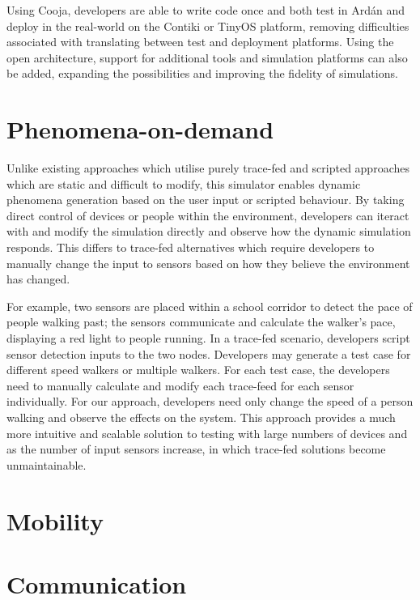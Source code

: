 Using Cooja, developers are able to write code once and both test in Ard\'{a}n and deploy in the real-world on the Contiki or TinyOS platform, removing difficulties associated with translating between test and deployment platforms. Using the open architecture, support for additional tools and simulation platforms can also be added, expanding the possibilities and improving the fidelity of simulations.

\section{Phenomena-on-demand} %
\label{sec:phenomena_on_demand}
Unlike existing approaches which utilise purely trace-fed and scripted approaches which are static and difficult to modify, this simulator enables dynamic phenomena generation based on the user input or scripted behaviour. 
By taking direct control of devices or people within the environment, developers can iteract with and modify the simulation directly and observe how the dynamic simulation responds. This differs to trace-fed alternatives which require developers to manually change the input to sensors based on how they believe the environment has changed. 

For example, two sensors are placed within a school corridor to detect the pace of people walking past; the sensors communicate and calculate the walker's pace, displaying a red light to people running. In a trace-fed scenario, developers script sensor detection inputs to the two nodes. Developers may generate a test case for different speed walkers or multiple walkers. For each test case, the developers need to manually calculate and modify each trace-feed for each sensor individually. For our approach, developers need only change the speed of a person walking and observe the effects on the system. This approach provides a much more intuitive and scalable solution to testing with large numbers of devices and as the number of input sensors increase, in which trace-fed solutions become unmaintainable.  

\section{Mobility} %
\label{sec:mobility}

\section{Communication} %
\label{sec:communication}

